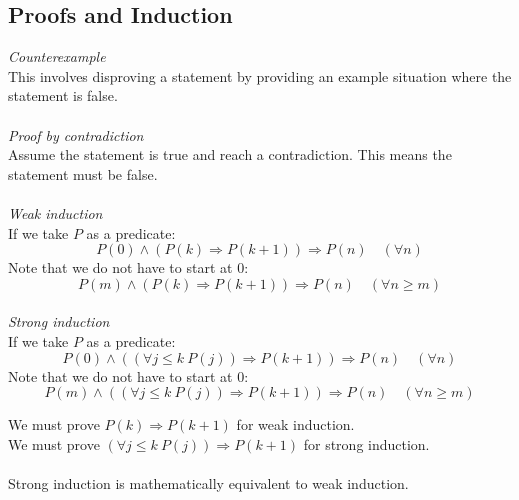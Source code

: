 \documentclass{scrartcl}
\begin{document}
\subsection{Proofs and Induction}
\textit{Counterexample}
\\
This involves disproving a statement by providing an example situation where the statement is false.
\\\\
\textit{Proof by contradiction}
\\
Assume the statement is true and reach a contradiction. This means the statement must be false.
\\\\
\textit{Weak induction}
\\
If we take $ P $ as a predicate:
\begin{equation}
P(0) \land (P(k) \Rightarrow P(k+1)) \Rightarrow P(n) \quad (\forall n)
\end{equation}
Note that we do not have to start at 0:
\begin{equation}
P(m) \land (P(k) \Rightarrow P(k+1)) \Rightarrow P(n) \quad (\forall n \geq m)
\end{equation}
\\
\textit{Strong induction}
\\
If we take $ P $ as a predicate:
\begin{equation}
P(0) \land ((\forall j \leq k \ P(j)) \Rightarrow P(k+1)) \Rightarrow P(n) \quad (\forall n)
\end{equation}
Note that we do not have to start at 0:
\begin{equation}
P(m) \land ((\forall j \leq k \ P(j)) \Rightarrow P(k+1)) \Rightarrow P(n) \quad (\forall n \geq m)
\end{equation}
\begin{tcolorbox}[breakable]
We must prove $ P(k) \Rightarrow P(k+1) $ for weak induction.
\\
We must prove $ (\forall j \leq k \ P(j)) \Rightarrow P(k+1) $ for strong induction.
\\\\
Strong induction is mathematically equivalent to weak induction.
\end{tcolorbox}
\end{document}
